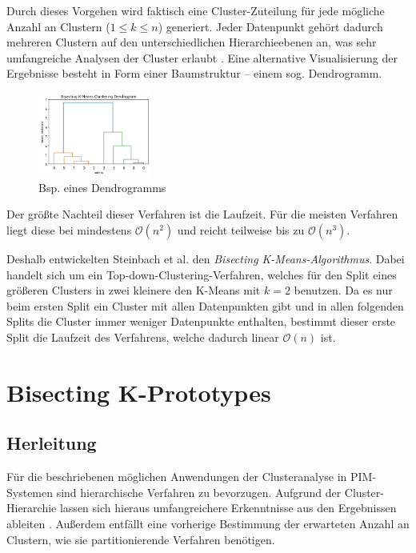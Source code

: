 Durch dieses Vorgehen wird faktisch eine Cluster-Zuteilung für jede
mögliche Anzahl an Clustern (\(1 \leq k \leq n\)) generiert. Jeder
Datenpunkt gehört dadurch mehreren Clustern auf den unterschiedlichen
Hierarchieebenen an, was sehr umfangreiche Analysen der Cluster erlaubt
\autocite{dogan2022}. Eine alternative Visualisierung der Ergebnisse
besteht in Form einer Baumstruktur -- einem sog. Dendrogramm.
\autocite{steinbach2000}

\begin{figure}
\centering
\includegraphics[width=0.33\textwidth,height=\textheight]{img/dengrogram-example.png}
\caption{Bsp. eines Dendrogramms}
\end{figure}

Der größte Nachteil dieser Verfahren ist die Laufzeit. Für die meisten
Verfahren liegt diese bei mindestens \(\mathcal{O}(n^2)\) und reicht
teilweise bis zu \(\mathcal{O}(n^3)\). \autocite{dogan2022}

Deshalb entwickelten Steinbach et al. \autocite{steinbach2000} den
\emph{Bisecting K-Means-Algorithmus}. Dabei handelt sich um ein
Top-down-Clustering-Verfahren, welches für den Split eines größeren
Clusters in zwei kleinere den K-Means mit \(k=2\) benutzen. Da es nur
beim ersten Split ein Cluster mit allen Datenpunkten gibt und in allen
folgenden Splits die Cluster immer weniger Datenpunkte enthalten,
bestimmt dieser erste Split die Laufzeit des Verfahrens, welche dadurch
linear \(\mathcal{O}(n)\) ist.

\hypertarget{bisecting-k-prototypes}{%
\section{Bisecting K-Prototypes}\label{bisecting-k-prototypes}}

\hypertarget{herleitung}{%
\subsection{Herleitung}\label{herleitung}}

Für die beschriebenen möglichen Anwendungen der Clusteranalyse in
PIM-Systemen sind hierarchische Verfahren zu bevorzugen. Aufgrund der
Cluster-Hierarchie lassen sich hieraus umfangreichere Erkenntnisse aus
den Ergebnissen ableiten \autocite{dogan2022}. Außerdem entfällt eine
vorherige Bestimmung der erwarteten Anzahl an Clustern, wie sie
partitionierende Verfahren benötigen.

